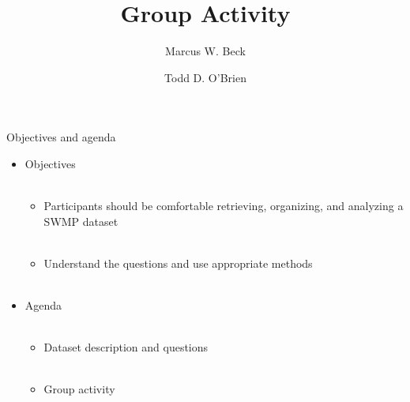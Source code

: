 \documentclass[xcolor=svgnames]{beamer}\usepackage[]{graphicx}\usepackage[]{color}
\begin{document}
\title[Group Activity]{Group Activity}

\author[M. Beck, T. O'Brien]{Marcus W. Beck \and Todd D. O'Brien}

\date{}







\begin{frame}{Objectives and agenda}
\begin{itemize}
\item Objectives \\~\\
\begin{itemize}
\item Participants should be comfortable retrieving, organizing, and analyzing a SWMP dataset \\~\\
\item Understand the questions and use appropriate methods\\~\\
\end{itemize}
\item Agenda \\~\\
\begin{itemize}
\item Dataset description and questions \\~\\
\item Group activity
\end{itemize}
\end{itemize}
\end{frame}
\end{document}

